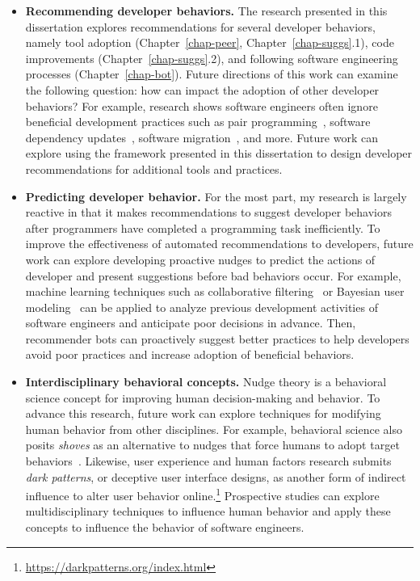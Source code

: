 \begin{itemize}
    \item \textbf{Recommending developer behaviors.} The research presented in this dissertation explores recommendations for several developer behaviors, namely tool adoption (Chapter~\ref{chap-peer}, Chapter~\ref{chap-suggs}.1), code improvements (Chapter~\ref{chap-suggs}.2), and following software engineering processes (Chapter~\ref{chap-bot}). Future directions of this work can examine the following question: how can \framework impact the adoption of other developer behaviors? For example, research shows software engineers often ignore beneficial development practices such as pair programming~\cite{Lui2010}, software dependency updates~\cite{Samim2017AutoPullRequests}, software migration~\cite{SmartSheet}, and more. Future work can explore using the framework presented in this dissertation to design developer recommendations for additional tools and practices.
    
    \item \textbf{Predicting developer behavior.} For the most part, my research is largely reactive in that it makes recommendations to suggest developer behaviors after programmers have completed a programming task inefficiently. To improve the effectiveness of automated recommendations to developers, future work can explore developing proactive nudges to predict the actions of developer and present suggestions before bad behaviors occur. For example, machine learning techniques such as collaborative filtering~\cite{Murphy-Hill2012Fluency} or Bayesian user modeling~\cite{HorvitzLumiere} can be applied to analyze previous development activities of software engineers and anticipate poor decisions in advance. Then, recommender bots can proactively suggest better practices to help developers avoid poor practices and increase adoption of beneficial behaviors.
    
    \item \textbf{Interdisciplinary behavioral concepts.} Nudge theory is a behavioral science concept for improving human decision-making and behavior. To advance this research, future work can explore techniques for modifying human behavior from other disciplines. For example, behavioral science also posits \textit{shoves} as an alternative to nudges that force humans to adopt target behaviors~\cite{Shove}. Likewise, user experience and human factors research submits \textit{dark patterns}, or deceptive user interface designs, as another form of indirect influence to alter user behavior online.\footnote{\url{https://darkpatterns.org/index.html}} Prospective studies can explore multidisciplinary techniques to influence human behavior and apply these concepts to influence the behavior of software engineers.
\end{itemize}

